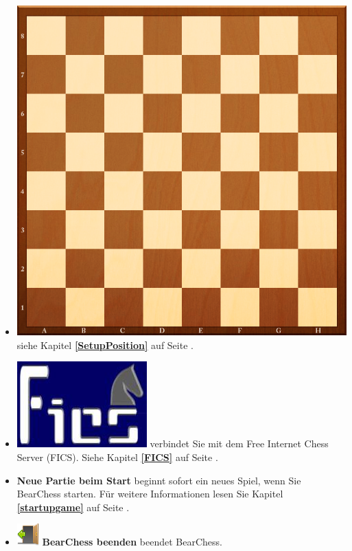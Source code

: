 \documentclass[11pt,a4paper]{article}
\begin{document}
\begin{itemize}
		\item \includegraphics[scale=0.03]{Chess_Board.png} siehe Kapitel \textbf{\ref{SetupPosition}  } auf Seite \pageref{SetupPosition}.
		
		\item \includegraphics[scale=0.1]{FicsLogo.png} verbindet Sie mit dem Free Internet Chess Server (FICS). Siehe Kapitel \textbf{\ref{FICS}  } auf Seite \pageref{FICS}.	
		
		\item \textbf{Neue Partie beim Start} beginnt sofort ein neues Spiel, wenn Sie BearChess starten. Für weitere Informationen lesen Sie Kapitel \textbf{\ref{startupgame}  } auf Seite \pageref{startupgame}.
		
		\item \includegraphics[scale=0.5]{door_out.png} \textbf{BearChess beenden} beendet BearChess.
	\end{itemize}
	
\end{document}
